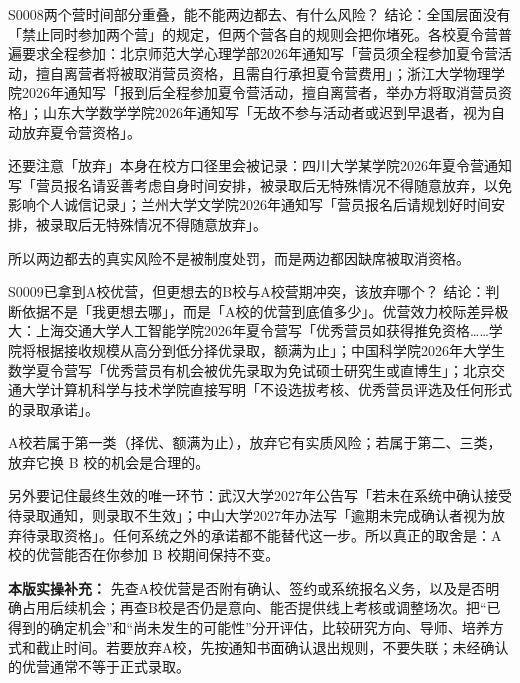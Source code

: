 \begin{qa}{S0008}{两个营时间部分重叠，能不能两边都去、有什么风险？}
结论：全国层面没有「禁止同时参加两个营」的规定，但两个营各自的规则会把你堵死。各校夏令营普遍要求全程参加：北京师范大学心理学部2026年通知写「营员须全程参加夏令营活动，擅自离营者将被取消营员资格，且需自行承担夏令营费用」；浙江大学物理学院2026年通知写「报到后全程参加夏令营活动，擅自离营者，举办方将取消营员资格」；山东大学数学学院2026年通知写「无故不参与活动者或迟到早退者，视为自动放弃夏令营资格」。

还要注意「放弃」本身在校方口径里会被记录：四川大学某学院2026年夏令营通知写「营员报名请妥善考虑自身时间安排，被录取后无特殊情况不得随意放弃，以免影响个人诚信记录」；兰州大学文学院2026年通知写「营员报名后请规划好时间安排，被录取后无特殊情况不得随意放弃」。

所以两边都去的真实风险不是被制度处罚，而是两边都因缺席被取消资格。
\end{qa}

\begin{qa}{S0009}{已拿到A校优营，但更想去的B校与A校营期冲突，该放弃哪个？}
结论：判断依据不是「我更想去哪」，而是「A校的优营到底值多少」。优营效力校际差异极大：上海交通大学人工智能学院2026年夏令营写「优秀营员如获得推免资格……学院将根据接收规模从高分到低分择优录取，额满为止」；中国科学院2026年大学生数学夏令营写「优秀营员有机会被优先录取为免试硕士研究生或直博生」；北京交通大学计算机科学与技术学院直接写明「不设选拔考核、优秀营员评选及任何形式的录取承诺」。

A校若属于第一类（择优、额满为止），放弃它有实质风险；若属于第二、三类，放弃它换 B 校的机会是合理的。

另外要记住最终生效的唯一环节：武汉大学2027年公告写「若未在系统中确认接受待录取通知，则录取不生效」；中山大学2027年办法写「逾期未完成确认者视为放弃待录取资格」。任何系统之外的承诺都不能替代这一步。所以真正的取舍是：A校的优营能否在你参加 B 校期间保持不变。
\par\textbf{本版实操补充：} 先查A校优营是否附有确认、签约或系统报名义务，以及是否明确占用后续机会；再查B校是否仍是意向、能否提供线上考核或调整场次。把“已得到的确定机会”和“尚未发生的可能性”分开评估，比较研究方向、导师、培养方式和截止时间。若要放弃A校，先按通知书面确认退出规则，不要失联；未经确认的优营通常不等于正式录取。
\end{qa}

